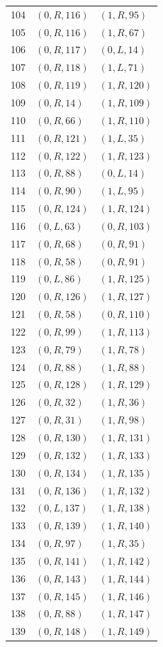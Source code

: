 \begin{longtable}{@{}rll@{}}
104 & $(0,R,116)$ & $(1,R,95)$\\
105 & $(0,R,116)$ & $(1,R,67)$\\
106 & $(0,R,117)$ & $(0,L,14)$\\
107 & $(0,R,118)$ & $(1,L,71)$\\
108 & $(0,R,119)$ & $(1,R,120)$\\
109 & $(0,R,14)$ & $(1,R,109)$\\
110 & $(0,R,66)$ & $(1,R,110)$\\
111 & $(0,R,121)$ & $(1,L,35)$\\
112 & $(0,R,122)$ & $(1,R,123)$\\
113 & $(0,R,88)$ & $(0,L,14)$\\
114 & $(0,R,90)$ & $(1,L,95)$\\
115 & $(0,R,124)$ & $(1,R,124)$\\
116 & $(0,L,63)$ & $(0,R,103)$\\
117 & $(0,R,68)$ & $(0,R,91)$\\
118 & $(0,R,58)$ & $(0,R,91)$\\
119 & $(0,L,86)$ & $(1,R,125)$\\
120 & $(0,R,126)$ & $(1,R,127)$\\
121 & $(0,R,58)$ & $(0,R,110)$\\
122 & $(0,R,99)$ & $(1,R,113)$\\
123 & $(0,R,79)$ & $(1,R,78)$\\
124 & $(0,R,88)$ & $(1,R,88)$\\
125 & $(0,R,128)$ & $(1,R,129)$\\
126 & $(0,R,32)$ & $(1,R,36)$\\
127 & $(0,R,31)$ & $(1,R,98)$\\
128 & $(0,R,130)$ & $(1,R,131)$\\
129 & $(0,R,132)$ & $(1,R,133)$\\
130 & $(0,R,134)$ & $(1,R,135)$\\
131 & $(0,R,136)$ & $(1,R,132)$\\
132 & $(0,L,137)$ & $(1,R,138)$\\
133 & $(0,R,139)$ & $(1,R,140)$\\
134 & $(0,R,97)$ & $(1,R,35)$\\
135 & $(0,R,141)$ & $(1,R,142)$\\
136 & $(0,R,143)$ & $(1,R,144)$\\
137 & $(0,R,145)$ & $(1,R,146)$\\
138 & $(0,R,88)$ & $(1,R,147)$\\
139 & $(0,R,148)$ & $(1,R,149)$\\

\end{longtable}
